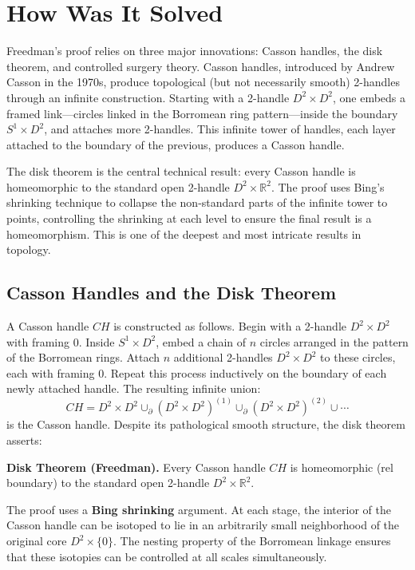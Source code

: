\section{How Was It Solved}

Freedman's proof relies on three major innovations: Casson handles, the disk theorem, and controlled surgery theory. Casson handles, introduced by Andrew Casson in the 1970s, produce topological (but not necessarily smooth) 2-handles through an infinite construction. Starting with a 2-handle $D^2 \times D^2$, one embeds a framed link---circles linked in the Borromean ring pattern---inside the boundary $S^1 \times D^2$, and attaches more 2-handles. This infinite tower of handles, each layer attached to the boundary of the previous, produces a Casson handle.

The disk theorem is the central technical result: every Casson handle is homeomorphic to the standard open 2-handle $D^2 \times \mathbb{R}^2$. The proof uses Bing's shrinking technique to collapse the non-standard parts of the infinite tower to points, controlling the shrinking at each level to ensure the final result is a homeomorphism. This is one of the deepest and most intricate results in topology.

\subsection*{Casson Handles and the Disk Theorem}

A Casson handle $CH$ is constructed as follows. Begin with a 2-handle $D^2 \times D^2$ with framing 0. Inside $S^1 \times D^2$, embed a chain of $n$ circles arranged in the pattern of the Borromean rings. Attach $n$ additional 2-handles $D^2 \times D^2$ to these circles, each with framing 0. Repeat this process inductively on the boundary of each newly attached handle. The resulting infinite union:
\[
CH = D^2 \times D^2 \cup_{\partial} (D^2 \times D^2)^{(1)} \cup_{\partial} (D^2 \times D^2)^{(2)} \cup \cdots
\]
is the Casson handle. Despite its pathological smooth structure, the disk theorem asserts:

\textbf{Disk Theorem (Freedman).} Every Casson handle $CH$ is homeomorphic (rel boundary) to the standard open 2-handle $D^2 \times \mathbb{R}^2$.

The proof uses a \textbf{Bing shrinking} argument. At each stage, the interior of the Casson handle can be isotoped to lie in an arbitrarily small neighborhood of the original core $D^2 \times \{0\}$. The nesting property of the Borromean linkage ensures that these isotopies can be controlled at all scales simultaneously.

